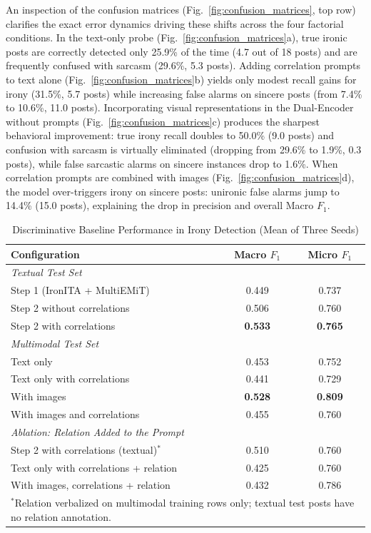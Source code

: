 An inspection of the confusion matrices (Fig.~\ref{fig:confusion_matrices}, top row) clarifies the exact error dynamics driving these shifts across the four factorial conditions. In the text-only probe (Fig.~\ref{fig:confusion_matrices}a), true ironic posts are correctly detected only 25.9\% of the time (4.7 out of 18 posts) and are frequently confused with sarcasm (29.6\%, 5.3 posts). Adding correlation prompts to text alone (Fig.~\ref{fig:confusion_matrices}b) yields only modest recall gains for irony (31.5\%, 5.7 posts) while increasing false alarms on sincere posts (from 7.4\% to 10.6\%, 11.0 posts). Incorporating visual representations in the Dual-Encoder without prompts (Fig.~\ref{fig:confusion_matrices}c) produces the sharpest behavioral improvement: true irony recall doubles to 50.0\% (9.0 posts) and confusion with sarcasm is virtually eliminated (dropping from 29.6\% to 1.9\%, 0.3 posts), while false sarcastic alarms on sincere instances drop to 1.6\%. When correlation prompts are combined with images (Fig.~\ref{fig:confusion_matrices}d), the model over-triggers irony on sincere posts: unironic false alarms jump to 14.4\% (15.0 posts), explaining the drop in precision and overall Macro $F_1$.

\begin{table}[!t]
\centering
\caption{Discriminative Baseline Performance in Irony Detection (Mean of Three Seeds)}
\label{tab:irony_baselines}
\footnotesize
\renewcommand{\arraystretch}{1.05}
\begin{tabular}{l c c}
\hline
\textbf{Configuration} & \textbf{Macro $F_1$} & \textbf{Micro $F_1$} \\
\hline
\multicolumn{3}{l}{\textit{Textual Test Set}} \\
Step 1 (IronITA + MultiEMiT) & 0.449 & 0.737 \\
Step 2 without correlations & 0.506 & 0.760 \\
Step 2 with correlations & \textbf{0.533} & \textbf{0.765} \\
\hline
\multicolumn{3}{l}{\textit{Multimodal Test Set}} \\
Text only & 0.453 & 0.752 \\
Text only with correlations & 0.441 & 0.729 \\
With images & \textbf{0.528} & \textbf{0.809} \\
With images and correlations & 0.455 & 0.760 \\
\hline
\multicolumn{3}{l}{\textit{Ablation: Relation Added to the Prompt}} \\
Step 2 with correlations (textual)$^{*}$ & 0.510 & 0.760 \\
Text only with correlations + relation & 0.425 & 0.760 \\
With images, correlations + relation & 0.432 & 0.786 \\
\hline
\multicolumn{3}{p{0.92\columnwidth}}{\footnotesize $^{*}$Relation verbalized on multimodal training rows only; textual test posts have no relation annotation.} \\
\end{tabular}
\end{table}

